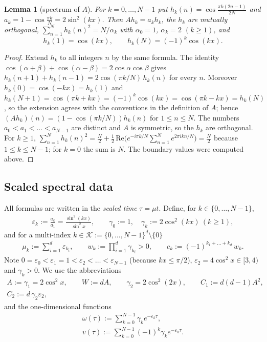 \documentclass[11pt,a4paper]{article}
\newtheorem{lemma}[theorem]{Lemma}
\theoremstyle{definition}
\theoremstyle{remark}
\begin{document}
\begin{lemma}[{spectrum of $A$}]
For $k=0,\dots,N-1$ put $h_k(n)=\cos\frac{\pi k(2n-1)}{2N}$ and $a_k=1-\cos\frac{\pi k}{N}=2\sin^2(kx)$. Then $Ah_k=a_kh_k$, the $h_k$ are mutually orthogonal, $\sum_{n=1}^Nh_k(n)^2=N/\alpha_k$ with $\alpha_0=1$, $\alpha_k=2$ $(k\ge1)$, and
\begin{equation*}
h_k(1)=\cos(kx),\qquad h_k(N)=(-1)^k\cos(kx).
\end{equation*}
\end{lemma}

\begin{proof}
Extend $h_k$ to all integers $n$ by the same formula. The identity $\cos(\alpha+\beta)+\cos(\alpha-\beta)=2\cos\alpha\cos\beta$ gives $h_k(n+1)+h_k(n-1)=2\cos(\pi k/N)\,h_k(n)$ for every $n$. Moreover $h_k(0)=\cos(-kx)=h_k(1)$ and $h_k(N+1)=\cos(\pi k+kx)=(-1)^k\cos(kx)=\cos(\pi k-kx)=h_k(N)$, so the extension agrees with the conventions in the definition of $A$; hence $(Ah_k)(n)=(1-\cos(\pi k/N))h_k(n)$ for $1\le n\le N$. The numbers $a_0<a_1<\dots<a_{N-1}$ are distinct and $A$ is symmetric, so the $h_k$ are orthogonal. For $k\ge 1$, $\sum_{n=1}^N h_k(n)^2=\frac N2+\frac12\,\mathrm{Re}\bigl(e^{-i\pi k/N}\sum_{n=1}^Ne^{2\pi ikn/N}\bigr)=\frac N2$ because $1\le k\le N-1$; for $k=0$ the sum is $N$. The boundary values were computed above.
\end{proof}

\subsection{Scaled spectral data}

All formulas are written in the \emph{scaled time} $\tau=\mu t$. Define, for $k\in\{0,\dots,N-1\}$,
\begin{gather*}
\varepsilon_k:=\frac{a_k}{a_1}=\frac{\sin^2(kx)}{\sin^2x}, \qquad \gamma_0:=1,\quad \gamma_k:=2\cos^2(kx)\ (k\ge1),
\end{gather*}
and for a multi-index $k\in\mathcal K:=\{0,\dots,N-1\}^d\setminus\{0\}$
\begin{gather*}
\mu_k:=\sum_{i=1}^d\varepsilon_{k_i}, \qquad w_k:=\prod_{i=1}^d\gamma_{k_i}>0, \qquad c_k:=(-1)^{k_1+\dots+k_d}\,w_k .
\end{gather*}
Note $0=\varepsilon_0<\varepsilon_1=1<\varepsilon_2<\dots<\varepsilon_{N-1}$ (because $kx\le\pi/2$), $\varepsilon_2=4\cos^2x\in[3,4)$ and $\gamma_k>0$. We use the abbreviations
\begin{gather*}
A:=\gamma_1=2\cos^2x, \qquad W:=dA, \qquad \gamma_2=2\cos^2(2x), \qquad C_1:=d(d-1)A^2, \\
C_2:=d\,\gamma_2\varepsilon_2 ,
\end{gather*}
and the one-dimensional functions
\begin{gather*}
\omega(\tau):=\sum_{k=0}^{N-1}\gamma_k e^{-\varepsilon_k\tau}, \\
v(\tau):=\sum_{k=0}^{N-1}(-1)^k\gamma_ke^{-\varepsilon_k\tau}.
\end{gather*}
\end{document}
